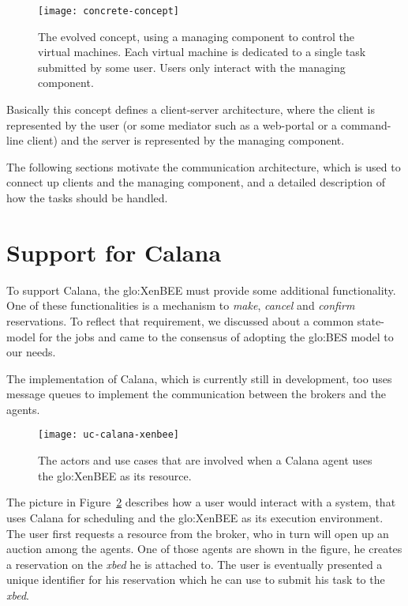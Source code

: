 \begin{figure}[htbp]
  \centering
  \texttt{[image: concrete-concept]}
  \caption[A more concrete concept]{The  evolved concept, using a managing
    component to  control the virtual  machines.  Each virtual  machine is
    dedicated to a single task submitted by some user. Users only interact
    with the managing component.}
  \label{fig:concrete-concept}
\end{figure}

Basically  this concept  defines a  client-server architecture,  where the
client is represented  by the user (or some mediator  such as a web-portal
or a  command-line client) and the  server is represented  by the managing
component.

The following  sections motivate the communication  architecture, which is
used  to connect up  clients and  the managing  component, and  a detailed
description of how the tasks should be handled.

\section{Support for Calana}
\label{sec:calana-support}

To  support  Calana, the  \gls{glo:XenBEE}  must  provide some  additional
functionality. One of these functionalities is a mechanism to \emph{make},
\emph{cancel}   and   \emph{confirm}   reservations.   To   reflect   that
requirement, we discussed about a common state-model for the jobs and came
to the consensus of adopting the \gls{glo:BES} model to our needs.

The implementation of Calana, which is currently still in development, too
uses message queues to implement the communication between the brokers and
the agents.

\begin{figure}[htbp]
  \centering
  \texttt{[image: uc-calana-xenbee]}
  \caption[Calana and  XenBEE]{The actors and use cases  that are involved
    when a Calana agent uses the \gls{glo:XenBEE} as its resource.}
  \label{fig:calana-xenbee}
\end{figure}

The picture  in Figure~\ref{fig:calana-xenbee} describes how  a user would
interact  with  a  system,  that   uses  Calana  for  scheduling  and  the
\gls{glo:XenBEE} as  its execution environment. The user  first requests a
resource from  the broker, who in turn  will open up an  auction among the
agents.   One of  those  agents are  shown  in the  figure,  he creates  a
reservation on the \emph{xbed} he  is attached to.  The user is eventually
presented  a unique identifier  for his  reservation which  he can  use to
submit his task to the \emph{xbed}.

